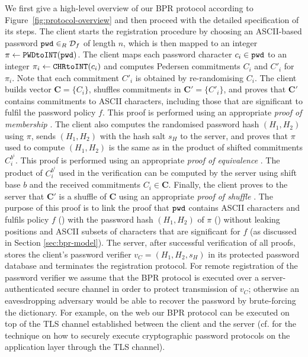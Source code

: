 We first give a high-level overview of our BPR protocol according to Figure~\ref{fig:protocol-overview} and then proceed with the detailed specification of its steps. The client starts the registration procedure by choosing an ASCII-based password $\mathtt{pwd}\in_R\mathcal{D}_f$ of length $n$, which is then mapped to an integer $\pi\gets\texttt{PWDtoINT}(\mathtt{pwd})$.
The client maps each password character $c_i\in\mathtt{pwd}$ to an integer $\pi_i\gets\texttt{CHRtoINT}(c_i)$ and computes Pedersen commitments $C_i$ and $C'_i$ for $\pi_i$. Note that each commitment $C'_i$ is obtained by re-randomising $C_i$. 
The client builds vector $\bm{C}=\{C_i\}$, shuffles commitments in $\bm{C'}=\{C'_i\}$, and proves that $\bm C'$ contains commitments to ASCII characters, including those that are significant to fulfil the password policy $f$. 
This proof is performed using an appropriate \emph{proof of membership} \PoM.
The client also computes the randomised password hash $(H_1, H_2)$ using $\pi$, sends $(H_1, H_2)$ with the hash salt $s_H$ to the server, and proves that $\pi$ used to compute $(H_1, H_2)$ is the same as in the product of shifted commitments $C^{{b^i}}_i$. 
This proof is performed using an appropriate \emph{proof of equivalence} \PoE.
The product of $C^{b^i}_i$ used in the verification can be computed by the server using shift base $b$ and the received commitments $C_i\in \bm C$.
Finally, the client proves to the server that $\bm C'$ is a shuffle of $\bm C$ using an appropriate \emph{proof of shuffle} \PoS. 
The purpose of this proof is to link the proof that $\mathtt{pwd}$ contains ASCII characters and fulfils policy $f$ (\PoM) with the password hash $(H_1, H_2)$ of $\pi$ (\PoE) without leaking positions and ASCII subsets of characters that are significant for $f$ (as discussed in Section \ref{sec:bpr-model}). 
The server, after successful verification of all proofs, stores the client's password verifier $v_C = (H_1,H_2,s_H)$ in its protected password database and terminates the registration protocol. 
For remote registration of the password verifier we assume that the \ac{BPR} protocol is executed over a server-authenticated secure channel in order to protect transmission of $v_C$; otherwise an eavesdropping adversary would be able to recover the password by brute-forcing the dictionary. 
For example, on the web our \ac{BPR} protocol can be executed on top of the TLS channel established between the client and the server (cf. \citet{Manulis2014} for the technique on how to securely execute cryptographic password protocols on the application layer through the TLS channel).



